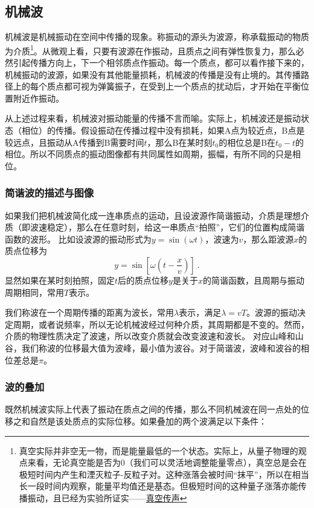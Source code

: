 
\subsection{机械波}
机械波是机械振动在空间中传播的现象。称振动的源头为波源，称承载振动的物质为介质\footnote{真空实际并非空无一物，而是能量最低的一个状态。实际上，从量子物理的观点来看，无论真空能是否为0（我们可以灵活地调整能量零点），真空总是会在极短时间内产生和湮灭粒子-反粒子对。这种涨落会被时间“抹平”，所以在相当长一段时间内观察，能量平均值还是基态。但极短时间的这种量子涨落亦能传播振动，且已经为实验所证实——\href{https://www.rmzxw.com.cn/c/2023-08-25/3399291.shtml}{真空传声}}。从微观上看，只要有波源在作振动，且质点之间有弹性恢复力，那么必然引起传播方向上，下一个相邻质点作振动。每一个质点，都可以看作接下来的，机械振动的波源，如果没有其他能量损耗，机械波的传播是没有止境的。其传播路径上的每个质点都可视为弹簧振子，在受到上一个质点的扰动后，才开始在平衡位置附近作振动。

从上述过程来看，机械波对振动能量的传播不言而喻。实际上，机械波还是振动状态（相位）的传播。假设振动在传播过程中没有损耗，如果A点为较近点，B点是较远点，且振动从A传播到B需要时间$t$，那么B在某时刻$t_0$的相位总是B在$t_0-t$的相位。所以不同质点的振动图像都有共同属性如周期，振幅，有所不同的只是相位。
\subsubsection{简谐波的描述与图像}
如果我们把机械波简化成一连串质点的运动，且设波源作简谐振动，介质是理想介质（即波速稳定），那么在任意时刻，给这一串质点“拍照”，它们的位置构成简谐函数的波形。
比如设波源的振动形式为$y=\sin(\omega t)$，波速为$v$，那么距波源$x$的质点位移为
\begin{equation}
y=\sin [\omega (t-\frac{x}{v})]~.
\end{equation}
显然如果在某时刻拍照，固定$t$后的质点位移$y$是关于$x$的简谐函数，且周期与振动周期相同，常用$T$表示。%

我们称波在一个周期传播的距离为波长，常用$\lambda $表示，满足$\lambda=vT$。波源的振动决定周期，或者说频率，所以无论机械波经过何种介质，其周期都是不变的。然而，介质的物理性质决定了波速，所以改变介质就会改变波速和波长。
对应山峰和山谷，我们称波的位移最大值为波峰，最小值为波谷。对于简谐波，波峰和波谷的相位差总是$\pi$。

\subsubsection{波的叠加}
既然机械波实际上代表了振动在质点之间的传播，那么不同机械波在同一点处的位移之和自然是该处质点的实际位移。如果叠加的两个波满足以下条件：

